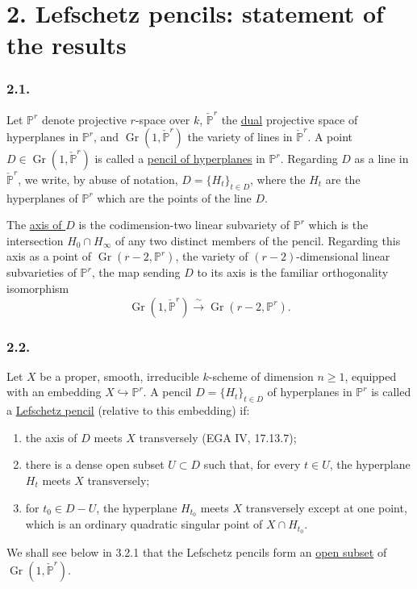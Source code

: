 \section*{2. Lefschetz pencils: statement of the results}

\subsubsection*{2.1.}
Let $\mathbb P^r$ denote projective $r$-space over $k$,
$\check{\mathbb P}^{r}$ the \underline{dual} projective space of
hyperplanes in $\mathbb P^r$, and
$\operatorname{Gr}(1,\check{\mathbb P}^{r})$ the variety of lines in
$\check{\mathbb P}^{r}$.  A point
$D\in\operatorname{Gr}(1,\check{\mathbb P}^{r})$ is called a
\underline{pencil of hyperplanes} in $\mathbb P^r$.  Regarding $D$ as
a line in $\check{\mathbb P}^{r}$, we write, by abuse of notation,
$D=\{H_t\}_{t\in D}$, where the $H_t$ are the hyperplanes of
$\mathbb P^r$ which are the points of the line $D$.

The \underline{axis of $D$} is the codimension-two linear subvariety
of $\mathbb P^r$ which is the intersection $H_0\cap H_\infty$ of any
two distinct members of the pencil.  Regarding this axis as a point
of $\operatorname{Gr}(r-2,\mathbb P^r)$, the variety of
$(r-2)$-dimensional linear subvarieties of $\mathbb P^r$, the map
sending $D$ to its axis is the familiar orthogonality isomorphism
\[
\operatorname{Gr}(1,\check{\mathbb P}^{r})
\xrightarrow{\ \sim\ }
\operatorname{Gr}(r-2,\mathbb P^r).
\]

\subsubsection*{2.2.}
Let $X$ be a proper, smooth, irreducible $k$-scheme of dimension
$n\geq1$, equipped with an embedding $X\hookrightarrow\mathbb P^r$.
A pencil $D=\{H_t\}_{t\in D}$ of hyperplanes in $\mathbb P^r$ is
called a \underline{Lefschetz pencil} (relative to this embedding) if:
\begin{enumerate}
\item[(a)] the axis of $D$ meets $X$ transversely (EGA IV, 17.13.7);
\item[(b)] there is a dense open subset $U\subset D$ such that, for
every $t\in U$, the hyperplane $H_t$ meets $X$ transversely;
\item[(c)] for $t_0\in D-U$, the hyperplane $H_{t_0}$ meets $X$
transversely except at one point, which is an ordinary quadratic
singular point of $X\cap H_{t_0}$.
\end{enumerate}
We shall see below in 3.2.1 that the Lefschetz pencils form an
\underline{open subset} of
$\operatorname{Gr}(1,\check{\mathbb P}^{r})$.

